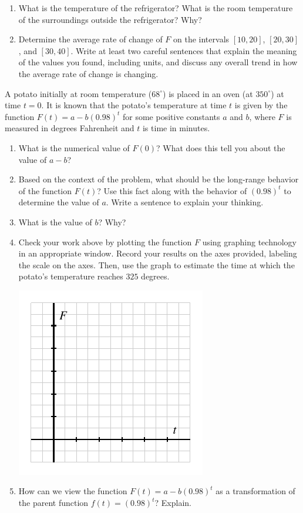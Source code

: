 \documentclass[nooutcomes]{ximera}
\begin{document}
\begin{exploration}
\begin{enumerate}[label=\alph*.]
\begin{image}
\end{image}
\item What is the temperature of the refrigerator? What is the room temperature of the surroundings outside the refrigerator? Why?
\item Determine the average rate of change of $F$ on the intervals $[10,20]$, $[20,30]$, and $[30,40]$. Write at least two careful sentences that explain the meaning of the values you found, including units, and discuss any overall trend in how the average rate of change is changing.
\end{enumerate}
\end{exploration}


\begin{exploration}
A potato initially at room temperature ($68^\circ$) is placed in an oven (at $350^\circ$) at time $t = 0$. It is known that the potato's temperature at time $t$ is given by the function $F(t) = a - b(0.98)^t$ for some positive constants $a$ and $b$, where $F$ is measured in degrees Fahrenheit and $t$ is time in minutes.

\begin{enumerate}[label=\alph*.]
\item What is the numerical value of $F(0)$? What does this tell you about the value of $a - b$?
\item Based on the context of the problem, what should be the long-range behavior of the function $F(t)$? Use this fact along with the behavior of $(0.98)^t$ to determine the value of $a$.  Write a sentence to explain your thinking.
\item What is the value of $b$?  Why?%
\item Check your work above by plotting the function $F$ using graphing technology in an appropriate window. Record your results on the axes provided, labeling the scale on the axes. Then, use the graph to estimate the time at which the potato's temperature reaches $325$ degrees.
\begin{image}
\includegraphics{modeling-F-t-blank-axes.pdf}
\end{image}
\item How can we view the function $F(t) = a - b(0.98)^t$ as a transformation of the parent function $f(t) = (0.98)^t$?  Explain.
\end{enumerate}
\end{exploration}
\end{document}
